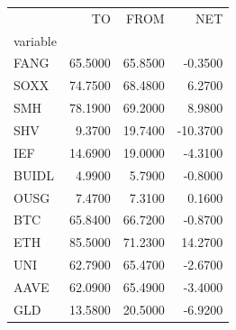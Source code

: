 \begin{tabular}{lrrr}
\toprule
 & TO & FROM & NET \\
variable &  &  &  \\
\midrule
FANG & 65.5000 & 65.8500 & -0.3500 \\
SOXX & 74.7500 & 68.4800 & 6.2700 \\
SMH & 78.1900 & 69.2000 & 8.9800 \\
SHV & 9.3700 & 19.7400 & -10.3700 \\
IEF & 14.6900 & 19.0000 & -4.3100 \\
BUIDL & 4.9900 & 5.7900 & -0.8000 \\
OUSG & 7.4700 & 7.3100 & 0.1600 \\
BTC & 65.8400 & 66.7200 & -0.8700 \\
ETH & 85.5000 & 71.2300 & 14.2700 \\
UNI & 62.7900 & 65.4700 & -2.6700 \\
AAVE & 62.0900 & 65.4900 & -3.4000 \\
GLD & 13.5800 & 20.5000 & -6.9200 \\
\bottomrule
\end{tabular}
